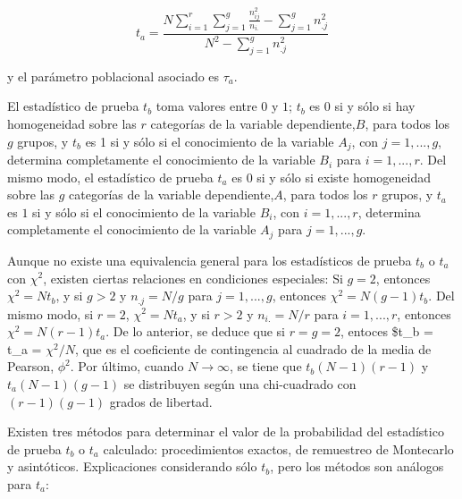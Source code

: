 \documentclass[12pt,a4paper,]{book}
\numberwithin{dummy}{section}
\theoremstyle{ocrenumbox}
\theoremstyle{blacknumex}
\theoremstyle{blacknumbox}
\theoremstyle{ocrenum}
\theoremstyle{ocrenum}
\begin{document}
\[
t_a=\frac{N\displaystyle\sum_{i=1}^r\displaystyle\sum_{j=1}^g\frac{n^2_{ij}}{n_{i.}}-\displaystyle\sum_{j=1}^gn^2_{.j}}{N^2-\displaystyle\sum_{j=1}^gn^2_{.j}}
\]

y el parámetro poblacional asociado es \(\tau_a\).

El estadístico de prueba \(t_b\) toma valores entre \(0\) y \(1\);
\(t_b\) es \(0\) si y sólo si hay homogeneidad sobre las \(r\)
categorías de la variable dependiente,\(B\), para todos los \(g\)
grupos, y \(t_b\) es 1 si y sólo si el conocimiento de la variable
\(A_j\), con \(j = 1,. . . ,g\), determina completamente el conocimiento
de la variable \(B_i\) para \(i = 1, . . . , r\). Del mismo modo, el
estadístico de prueba \(t_a\) es \(0\) si y sólo si existe homogeneidad
sobre las \(g\) categorías de la variable dependiente,\(A\), para todos
los \(r\) grupos, y \(t_a\) es \(1\) si y sólo si el conocimiento de la
variable \(B_i\), con \(i = 1, . . . ,r\), determina completamente el
conocimiento de la variable \(A_j\) para \(j = 1, . . . , g\).

Aunque no existe una equivalencia general para los estadísticos de
prueba \(t_b\) o \(t_a\) con \(\chi^2\), existen ciertas relaciones en
condiciones especiales: Si \(g = 2\), entonces \(\chi^2 = Nt_b\), y si
\(g > 2\) y \(n_{.j} = N/g\) para \(j = 1, ... , g\), entonces
\(\chi^2= N(g -1)t_b\). Del mismo modo, si \(r = 2\), \(\chi^2 = Nt_a\),
y si \(r > 2\) y \(n_{i.} = N/r\) para \(i = 1, . . . , r\), entonces
\(\chi^2 = N(r - 1)t_a\). De lo anterior, se deduce que si
\(r = g = 2\), entoces \$t\_b = t\_a = \(\chi^2/N\), que es el
coeficiente de contingencia al cuadrado de la media de Pearson,
\(\phi^2\). Por último, cuando \(N \rightarrow \infty\), se tiene que
\(t_b(N - 1)(r - 1)\) y \(t_a(N - 1)(g - 1)\) se distribuyen según una
chi-cuadrado con \((r - 1)(g - 1)\) grados de libertad.

Existen tres métodos para determinar el valor de la probabilidad del
estadístico de prueba \(t_b\) o \(t_a\) calculado: procedimientos
exactos, de remuestreo de Montecarlo y asintóticos. Explicaciones
considerando sólo \(t_b\), pero los métodos son análogos para \(t_a\):
\end{document}
